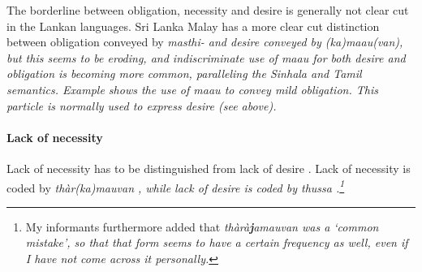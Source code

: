 
The borderline between obligation, necessity and desire is generally not clear cut in the Lankan languages. Sri Lanka Malay has a more clear cut distinction between obligation conveyed by \em masthi- \em and desire conveyed by \em (ka)maau(van)\em, but this seems to be eroding, and indiscriminate use of \em maau \em for both desire and obligation is becoming more common, paralleling the Sinhala and Tamil semantics. Example  shows the use of \em maau \em to convey mild obligation. This particle is normally used to express desire (see above).


\paragraph{Lack of necessity}\label{sec:func:Lackofnecessity}
Lack of necessity has to be distinguished from lack of desire . Lack of necessity is coded by \em thàr(ka)mauvan \em {}, while lack of desire is coded by \em thussa \em {}.\footnote{My informants furthermore added that \em thàrà\textbf{j}amauvan \em was a `common mistake', so that that form seems to have a certain frequency as well, even if I have not come across it personally.}



